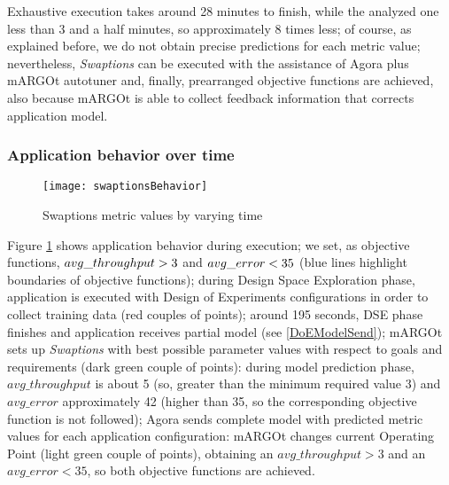 Exhaustive execution takes around 28 minutes to finish, while the analyzed one less than 3 and a half minutes, so approximately 8 times less; of course, as explained before, we do not obtain precise predictions for each metric value; nevertheless, \textit{Swaptions} can be executed with the assistance of Agora plus mARGOt autotuner and, finally, prearranged objective functions are achieved, also because mARGOt is able to collect feedback information that corrects application model.


\subsubsection{Application behavior over time}

\begin{figure}[h]

    \centering
    
    \texttt{[image: swaptionsBehavior]}
    
    \caption{Swaptions metric values by varying time}
    
    \label{fig::sw::beh}
    
\end{figure}

Figure \ref{fig::sw::beh} shows application behavior during execution; we set, as objective functions, $avg\_\-throughput > 3$ and $avg\_\-error < 35$ (blue lines highlight boundaries of objective functions); during Design Space Exploration phase, application is executed with Design of Experiments configurations in order to collect training data (red couples of points); around 195 seconds, DSE phase finishes and application receives partial model (see \ref{DoEModelSend}); mARGOt sets up \textit{Swaptions} with best possible parameter values with respect to goals and requirements (dark green couple of points): during model prediction phase, $avg\_throughput$ is about 5 (so, great\-er than the minimum required value 3) and $avg\_error$ approximately 42 (higher than 35, so the corresponding objective function is not followed); Agora sends complete model with predicted metric values for each application configuration: mARGOt changes current Operating Point (light green couple of points), obtaining an $avg\_throughput > 3$ and an $avg\_error < 35$, so both objective functions are achieved. 

